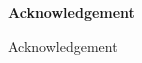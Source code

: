 \cleardoublepage
{}
{}

\begin{center}
\textbf{\large Acknowledgement}
\end{center}

Acknowledgement